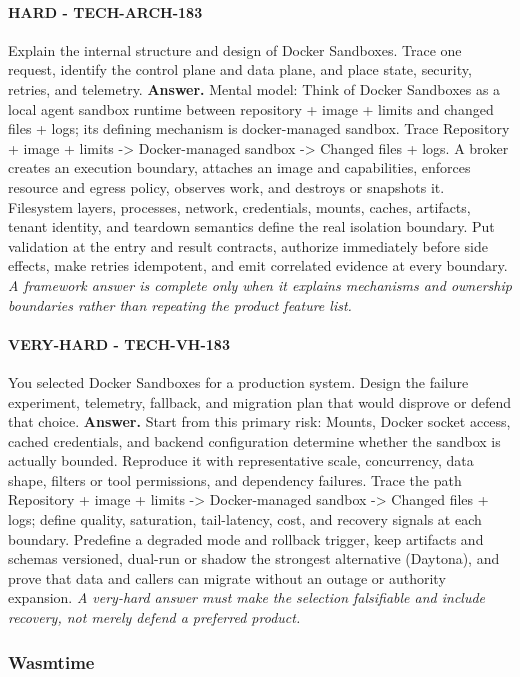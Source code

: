 \paragraph{HARD - TECH-ARCH-183} Explain the internal structure and design of Docker Sandboxes. Trace one request, identify the control plane and data plane, and place state, security, retries, and telemetry.
\textbf{Answer.} Mental model: Think of Docker Sandboxes as a local agent sandbox runtime between repository + image + limits and changed files + logs; its defining mechanism is docker-managed sandbox. Trace Repository + image + limits -> Docker-managed sandbox -> Changed files + logs. A broker creates an execution boundary, attaches an image and capabilities, enforces resource and egress policy, observes work, and destroys or snapshots it. Filesystem layers, processes, network, credentials, mounts, caches, artifacts, tenant identity, and teardown semantics define the real isolation boundary. Put validation at the entry and result contracts, authorize immediately before side effects, make retries idempotent, and emit correlated evidence at every boundary.
\textit{A framework answer is complete only when it explains mechanisms and ownership boundaries rather than repeating the product feature list.}
\paragraph{VERY-HARD - TECH-VH-183} You selected Docker Sandboxes for a production system. Design the failure experiment, telemetry, fallback, and migration plan that would disprove or defend that choice.
\textbf{Answer.} Start from this primary risk: Mounts, Docker socket access, cached credentials, and backend configuration determine whether the sandbox is actually bounded. Reproduce it with representative scale, concurrency, data shape, filters or tool permissions, and dependency failures. Trace the path Repository + image + limits -> Docker-managed sandbox -> Changed files + logs; define quality, saturation, tail-latency, cost, and recovery signals at each boundary. Predefine a degraded mode and rollback trigger, keep artifacts and schemas versioned, dual-run or shadow the strongest alternative (Daytona), and prove that data and callers can migrate without an outage or authority expansion.
\textit{A very-hard answer must make the selection falsifiable and include recovery, not merely defend a preferred product.}
\subsubsection*{Wasmtime}
